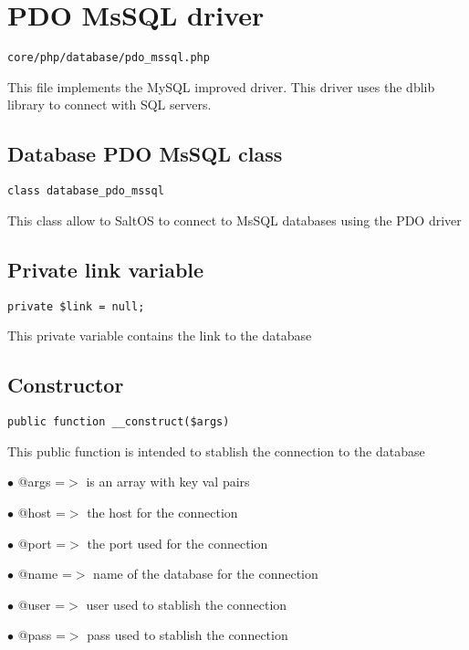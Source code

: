 \documentclass[a4paper]{book}
\begin{document}
\hypertarget{toc323}{}
\section{PDO MsSQL driver}

\begin{lstlisting}
core/php/database/pdo_mssql.php
\end{lstlisting}

This file implements the MySQL improved driver. This driver uses the dblib library to connect
with SQL servers.

\hypertarget{toc324}{}
\subsection{Database PDO MsSQL class}

\begin{lstlisting}
class database_pdo_mssql
\end{lstlisting}

This class allow to SaltOS to connect to MsSQL databases using the PDO driver

\hypertarget{toc325}{}
\subsection{Private link variable}

\begin{lstlisting}
private $link = null;
\end{lstlisting}

This private variable contains the link to the database

\hypertarget{toc326}{}
\subsection{Constructor}

\begin{lstlisting}
public function __construct($args)
\end{lstlisting}

This public function is intended to stablish the connection to the database

\begin{compactitem}
\item[\color{myblue}$\bullet$] @args =$>$ is an array with key val pairs
\item[\color{myblue}$\bullet$] @host =$>$ the host for the connection
\item[\color{myblue}$\bullet$] @port =$>$ the port used for the connection
\item[\color{myblue}$\bullet$] @name =$>$ name of the database for the connection
\item[\color{myblue}$\bullet$] @user =$>$ user used to stablish the connection
\item[\color{myblue}$\bullet$] @pass =$>$ pass used to stablish the connection
\end{compactitem}
\end{document}
